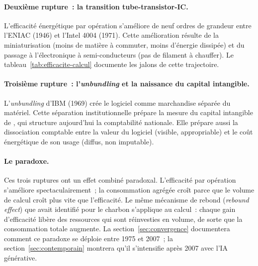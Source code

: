 \paragraph{Deuxième rupture~: la transition tube-transistor-IC.} L'efficacité énergétique par opération s'améliore de neuf ordres de grandeur entre l'ENIAC (1946) et l'Intel 4004 (1971). Cette amélioration résulte de la miniaturisation (moins de matière à commuter, moins d'énergie dissipée) et du passage à l'électronique à semi-conducteurs (pas de filament à chauffer). Le tableau~\ref{tab:efficacite-calcul} documente les jalons de cette trajectoire.

\paragraph{Troisième rupture~: l'\emph{unbundling} et la naissance du capital intangible.} L'\emph{unbundling} d'IBM (1969) crée le logiciel comme marchandise séparée du matériel. Cette séparation institutionnelle prépare la mesure du capital intangible de \textcite{corrado_intangible_2005}, qui structure aujourd'hui la comptabilité nationale. Elle prépare aussi la dissociation comptable entre la valeur du logiciel (visible, appropriable) et le coût énergétique de son usage (diffus, non imputable).

%
\paragraph{Le paradoxe.} Ces trois ruptures ont un effet combiné paradoxal. L'efficacité par opération s'améliore spectaculairement~; la consommation agrégée croît parce que le volume de calcul croît plus vite que l'efficacité. Le même mécanisme de rebond (\emph{rebound effect}) que \textcite{jevons_coal_1865} avait identifié pour le charbon s'applique au calcul~: chaque gain d'efficacité libère des ressources qui sont réinvesties en volume, de sorte que la consommation totale augmente. La section~\ref{sec:convergence} documentera comment ce paradoxe se déploie entre 1975 et 2007~; la section~\ref{sec:contemporain} montrera qu'il s'intensifie après 2007 avec l'IA générative.


